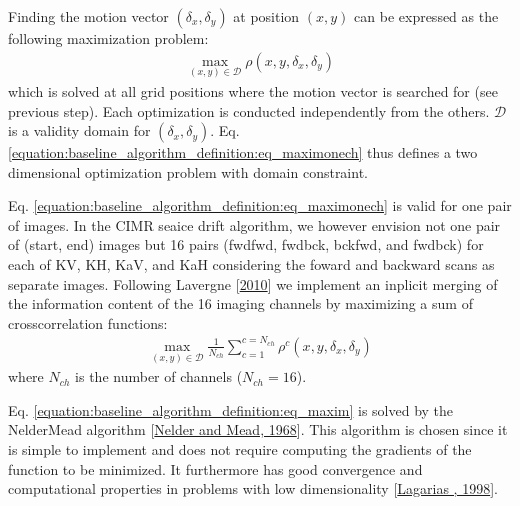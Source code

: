 \documentclass[letterpaper,10pt,english]{jupyterBook}
\begin{document}
\sphinxAtStartPar
Finding the motion vector \((\delta_x,\delta_y)\) at position \((x,y)\) can
be expressed as the following maximization problem:
\begin{equation}\label{equation:baseline_algorithm_definition:eq_maximonech}
\begin{split}
\max_{(x,y)\in\mathcal{D}} \rho(x,y,\delta_x,\delta_y)
\end{split}
\end{equation}
\sphinxAtStartPar
which is solved at all grid positions where the motion vector is searched for (see previous step). Each optimization is conducted independently
from the others. \(\mathcal{D}\) is a validity domain for \((\delta_x,\delta_y)\). Eq. \eqref{equation:baseline_algorithm_definition:eq_maximonech} thus defines a two dimensional optimization
problem with domain constraint.

\sphinxAtStartPar
Eq. \eqref{equation:baseline_algorithm_definition:eq_maximonech} is valid for one pair of images. In the CIMR sea\sphinxhyphen{}ice drift algorithm, we however envision not one pair of (start, end) images but 16 pairs
(fwd\sphinxhyphen{}fwd, fwd\sphinxhyphen{}bck, bck\sphinxhyphen{}fwd, and fwd\sphinxhyphen{}bck) for each of K\sphinxhyphen{}V, K\sphinxhyphen{}H, Ka\sphinxhyphen{}V, and Ka\sphinxhyphen{}H considering the foward and backward scans as separate images. Following Lavergne  {[}\hyperlink{cite.references:id19}{2010}{]}
we implement an inplicit merging of the information content of the 16 imaging channels by maximizing a sum of cross\sphinxhyphen{}correlation functions:
\begin{equation}\label{equation:baseline_algorithm_definition:eq_maxim}
\begin{split}
\max_{(x,y)\in\mathcal{D}} \frac{1}{N_{ch}} \sum_{c=1}^{c=N_{ch}} \rho^{c}(x,y,\delta_x,\delta_y)
\end{split}
\end{equation}
\sphinxAtStartPar
where \(N_{ch}\) is the number of channels (\(N_{ch} = 16\)).

\sphinxAtStartPar
Eq. \eqref{equation:baseline_algorithm_definition:eq_maxim} is solved by the Nelder\sphinxhyphen{}Mead algorithm {[}\hyperlink{cite.references:id24}{Nelder and Mead, 1968}{]}. This algorithm is
chosen since it is simple to implement and does not require computing the gradients of the function to be minimized. It furthermore has good convergence
and computational properties in problems with low dimensionality {[}\hyperlink{cite.references:id18}{Lagarias , 1998}{]}.
\end{document}
